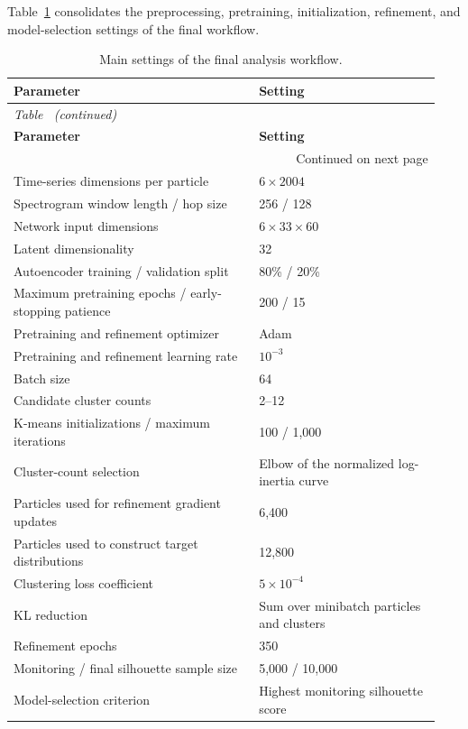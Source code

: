 Table~\ref{tab:settings} consolidates the preprocessing, pretraining, initialization, refinement, and model-selection settings of the final workflow.

\begingroup\small
\begin{longtable}{@{}p{0.54\linewidth}p{0.4\linewidth}@{}}
\caption{Main settings of the final analysis workflow.}\label{tab:settings}\\
\toprule
\textbf{Parameter} & \textbf{Setting} \\
\midrule
\endfirsthead
\multicolumn{2}{l}{\small\itshape Table~\thetable{} (continued)}\\
\toprule
\textbf{Parameter} & \textbf{Setting} \\
\midrule
\endhead
\midrule
\multicolumn{2}{r}{\small Continued on next page}\\
\endfoot
\bottomrule
\endlastfoot
Time-series dimensions per particle & \(6\times2004\) \\
Spectrogram window length / hop size & 256 / 128 \\
Network input dimensions & \(6\times33\times60\) \\
Latent dimensionality & 32 \\
Autoencoder training / validation split & 80\% / 20\% \\
Maximum pretraining epochs / early-stopping patience & 200 / 15 \\
Pretraining and refinement optimizer & Adam \\
Pretraining and refinement learning rate & \(10^{-3}\) \\
Batch size & 64 \\
Candidate cluster counts & 2--12 \\
K-means initializations / maximum iterations & 100 / 1,000 \\
Cluster-count selection & Elbow of the normalized log-inertia curve \\
Particles used for refinement gradient updates & 6,400 \\
Particles used to construct target distributions & 12,800 \\
Clustering loss coefficient & \(5\times10^{-4}\) \\
KL reduction & Sum over minibatch particles and clusters \\
Refinement epochs & 350 \\
Monitoring / final silhouette sample size & 5,000 / 10,000 \\
Model-selection criterion & Highest monitoring silhouette score \\
\end{longtable}
\endgroup